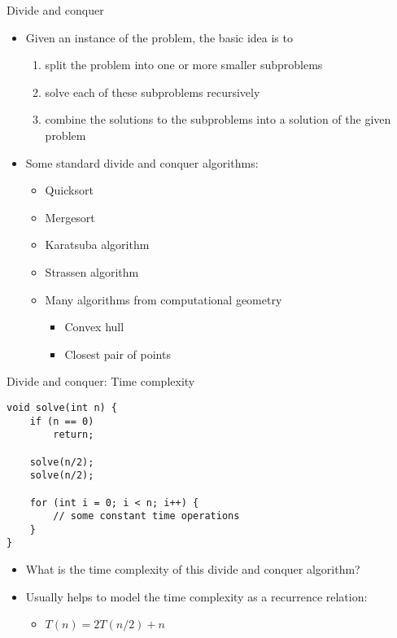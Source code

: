 \documentclass[12pt,t]{beamer}
\newcommand{\bi}{\begin{itemize}}
\newcommand{\ei}{\end{itemize}}
\begin{document}

\begin{frame}{Divide and conquer}
    \vspace{10pt}
    \bi
        \item Given an instance of the problem, the basic idea is to
            \begin{enumerate}
                \item split the problem into one or more smaller subproblems
                \item solve each of these subproblems recursively
                \item combine the solutions to the subproblems into a solution of the given problem
            \end{enumerate}

        \vspace{10pt}

        \item Some standard divide and conquer algorithms:
            \bi
                \item Quicksort
                \item Mergesort
                \item Karatsuba algorithm
                \item Strassen algorithm
                \item Many algorithms from computational geometry
                    \bi
                        \item Convex hull
                        \item Closest pair of points
                    \ei
            \ei
    \ei
\end{frame}

\begin{frame}[fragile]{Divide and conquer: Time complexity}
    \begin{verbatim}
void solve(int n) {
    if (n == 0)
        return;

    solve(n/2);
    solve(n/2);

    for (int i = 0; i < n; i++) {
        // some constant time operations
    }
}
    \end{verbatim}

    \bi
        \item What is the time complexity of this divide and conquer algorithm?
        \item Usually helps to model the time complexity as a recurrence relation:
            \bi
                \item $T(n) = 2T(n/2) + n$
            \ei
    \ei
\end{frame}
\end{document}

